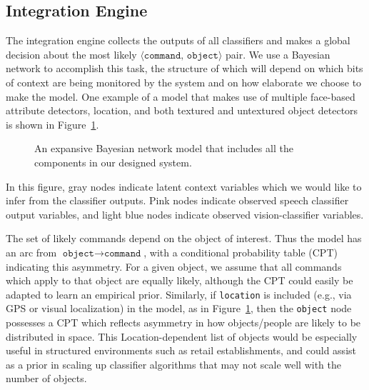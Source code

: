 \documentclass{llncs}
\begin{document}
\subsection{Integration Engine}
The integration engine collects the outputs of all classifiers and
makes a global decision about the most likely $\langle
\texttt{command, object}\rangle$ pair. We use a Bayesian network
to accomplish this task, the structure of which  will depend on
which bits of context are being monitored by the system and on how
elaborate we choose to make the model. One example of a model
that makes use of multiple face-based attribute detectors, location,
and both textured and untextured object detectors is shown in
Figure~\ref{fig:bn_full}.
\begin{figure} [t]
\caption{An expansive Bayesian network model that includes all the components in our designed system.}
\label{fig:bn_full}
\end{figure}
In this figure, gray nodes indicate latent context variables which we
would like to infer from the classifier outputs. Pink nodes indicate
observed speech classifier output variables, and light blue nodes
indicate observed vision-classifier variables.

The set of likely commands depend on the object of interest. Thus the
model has an arc from $\texttt{object}\rightarrow \texttt{command}$, with a conditional
probability table (CPT) indicating this asymmetry. For a given object,
we assume that all commands which apply to that object are equally
likely, although the CPT could easily be adapted to learn an
empirical prior. Similarly, if \texttt{location} is
included (e.g., via GPS or visual localization) in the model, as in Figure~\ref{fig:bn_full}, then the \texttt{object} node possesses a CPT which reflects asymmetry in how
objects/people are likely to be distributed in space. This
Location-dependent list of objects would be especially useful in
structured environments such as retail establishments, and could
assist as a prior in scaling up classifier algorithms that may not scale well
with the number of objects.
\end{document}
